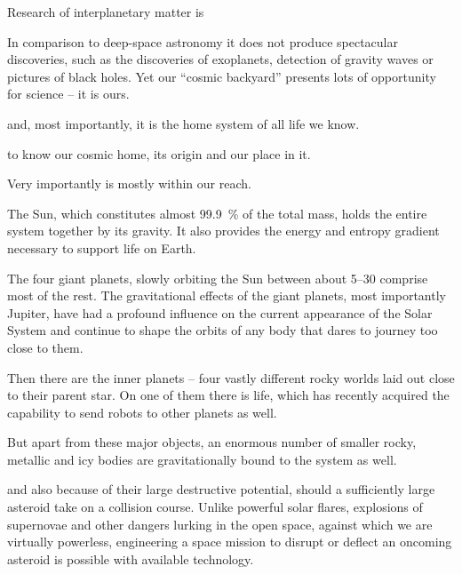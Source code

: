 

Research of interplanetary matter is 

In comparison to deep-space astronomy it does not produce spectacular discoveries,
such as the discoveries of exoplanets, detection of gravity waves or pictures of black holes.
Yet our ``cosmic backyard'' presents lots of opportunity for science -- it is ours.

and, most importantly, it is the home system of all life we know.

to know our cosmic home, its origin and our place in it.

Very importantly is mostly within our reach.

The Sun, which constitutes almost \SI{99.9}{\percent} of the total mass, holds the entire
system together by its gravity. It also provides the energy and entropy gradient necessary
to support life on Earth.

The four giant planets, slowly orbiting the Sun between about \SIrange[range-phrase = {and}]{5}{30}{\au}
comprise most of the rest. The gravitational effects of the giant planets, most importantly Jupiter,
have had a profound influence on the current appearance of the Solar System and continue to
shape the orbits of any body that dares to journey too close to them.

Then there are the inner planets -- four vastly different rocky worlds laid out
close to their parent star. On one of them there is life,
which has recently acquired the capability to send robots to other planets as well.

But apart from these major objects, an enormous number of smaller rocky, metallic and icy
bodies are gravitationally bound to the system as well.

and also because of their large destructive potential, should a sufficiently large asteroid take on a collision course.
Unlike powerful solar flares, explosions of supernovae and other dangers lurking in the open space, against which we are
virtually powerless, engineering a space mission to disrupt or deflect an oncoming asteroid is possible with
available technology.

